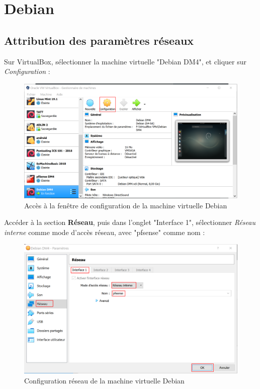 \section{Debian}
\subsection{Attribution des paramètres réseaux}

Sur VirtualBox, sélectionner la machine virtuelle "Debian DM4", et cliquer sur \textit{Configuration} :
  \begin{figure}[h!]
     \begin{center}
         \includegraphics[scale=0.5]{Debian_screenshots/Config/1.png}
         \caption{Accès à la fenêtre de configuration de la machine virtuelle Debian}
         \label{Debian_screenshots/Config/1}
     \end{center}
  \end{figure}
  \FloatBarrier
     
Accéder à la section \textbf{Réseau}, puis dans l'onglet "Interface 1", sélectionner \textit{Réseau interne} comme mode d'accès réseau, avec "pfsense" comme nom :
  \begin{figure}[h!]
     \begin{center}
         \includegraphics[scale=0.6]{Debian_screenshots/Config/2.png}
         \caption{Configuration réseau de la machine virtuelle Debian}
         \label{Debian_screenshots/Config/2}
     \end{center}
  \end{figure}
  \FloatBarrier

